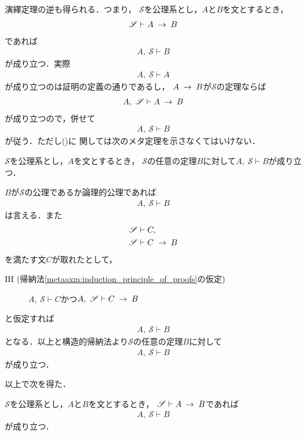 	演繹定理の逆も得られる．つまり，
	$\mathscr{S}$を公理系とし，$A$と$B$を文とするとき，
	\begin{align}
		\mathscr{S} \vdash A \hspace{0.25em}\rightarrow\hspace{0.25em} B
	\end{align}
	であれば
	\begin{align}
		A,\ \mathscr{S} \vdash B
	\end{align}
	が成り立つ．実際
	\begin{align}
		A,\ \mathscr{S} \vdash A
	\end{align}
	が成り立つのは証明の定義の通りであるし，
	$A \hspace{0.25em}\rightarrow\hspace{0.25em} B$が$\mathscr{S}$の定理ならば
	\begin{align}
		A,\ \mathscr{S} \vdash A \hspace{0.25em}\rightarrow\hspace{0.25em} B
		\label{fom:inversion_of_deduction_theorem}
	\end{align}
	が成り立つので，併せて
	\begin{align}
		A,\ \mathscr{S} \vdash B
	\end{align}
	が従う．ただし()に
	関しては次のメタ定理を示さなくてはいけない．
	
	\begin{screen}
		\begin{metathm}[公理が増えても証明可能]
			$\mathscr{S}$を公理系とし，$A$を文とするとき，
			$\mathscr{S}$の任意の定理$B$に対して$A,\ \mathscr{S} \vdash B$が成り立つ．
		\end{metathm}
	\end{screen}
	
	\begin{metaprf}
		$B$が$\mathscr{S}$の公理であるか論理的公理であれば
		\begin{align}
			A,\ \mathscr{S} \vdash B
		\end{align}
		は言える．また
		\begin{align}
			\mathscr{S} &\vdash C, \\
			\mathscr{S} &\vdash C \hspace{0.25em}\rightarrow\hspace{0.25em} B
		\end{align}
		を満たす文$C$が取れたとして，
		\begin{description}
			\item[IH (帰納法\ref{metaaxm:induction_principle_of_proofs}の仮定)]
				$A,\ \mathscr{S} \vdash C$かつ$A,\ \mathscr{S} \vdash C \hspace{0.25em}\rightarrow\hspace{0.25em} B$
		\end{description}
		と仮定すれば
		\begin{align}
			A,\ \mathscr{S} \vdash B
		\end{align}
		となる．以上と構造的帰納法より$\mathscr{S}$の任意の定理$B$に対して
		\begin{align}
			A,\ \mathscr{S} \vdash B
		\end{align}
		が成り立つ．
		\QED
	\end{metaprf}
	
	以上で次を得た．
	\begin{screen}
		\begin{metathm}[演繹定理の逆]
		\label{metathm:inverse_of_deduction_theorem}
			$\mathscr{S}$を公理系とし，$A$と$B$を文とするとき，
			$\mathscr{S} \vdash A \hspace{0.25em}\rightarrow\hspace{0.25em} B$であれば
			\begin{align}
				A,\ \mathscr{S} \vdash B
			\end{align}
			が成り立つ．
		\end{metathm}
	\end{screen}